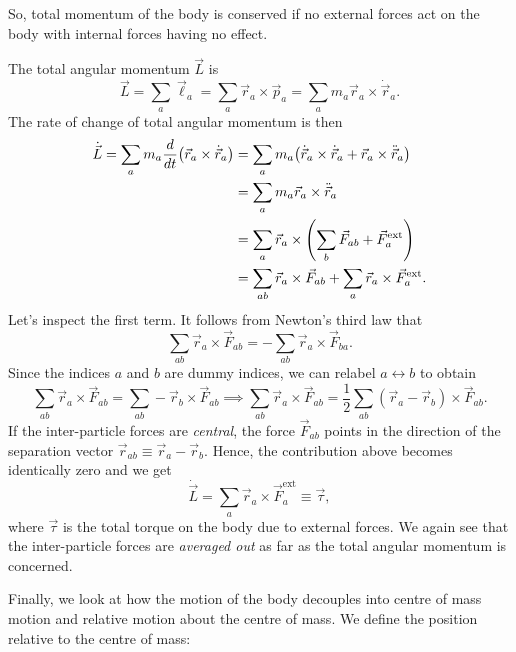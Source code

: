 \documentclass{article}
\begin{document}
So, total momentum of the body is conserved if no external forces act on the body with internal forces having no effect.
\par
The total angular momentum $\vec{L}$ is
\begin{equation}
    \vec{L} = \sum_a \vec{\ell}_a = \sum_a \vec{r}_a \times \vec{p}_a = \sum_a m_a \vec{r}_a \times \dot{\vec{r}}_a.
\end{equation}
The rate of change of total angular momentum is then
\begin{align}
    \begin{split}
        \dot{\vec{L}} = \sum_a m_a \dv{}{t} \qty(\vec{r}_a \times \dot{\vec{r}}_a) &= \sum_a m_a \qty(\dot{\vec{r}}_a \times \dot{\vec{r}}_a + \vec{r}_a \times \ddot{\vec{r}}_a) \\
        &= \sum_a m_a  \vec{r}_a \times \ddot{\vec{r}}_a \\
        &= \sum_a  \vec{r}_a \times \qty(\sum_b \vec{F}_{ab} + \vec{F}_a^{\text{ext}}) \\
        &= \sum_{ab} \vec{r}_a \times \vec{F}_{ab} + \sum_a \vec{r}_a \times \vec{F}_a^{\text{ext}}.
    \end{split}
\end{align}
Let's inspect the first term. It follows from Newton's third law that
\[
    \sum_{ab} \vec{r}_a \times \vec{F}_{ab} = - \sum_{ab} \vec{r}_a \times \vec{F}_{ba}.
\]
Since the indices $a$ and $b$ are dummy indices, we can relabel $a \leftrightarrow b$ to obtain
\begin{equation}
     \sum_{ab} \vec{r}_a \times \vec{F}_{ab} = \sum_{ab} -\vec{r}_b \times \vec{F}_{ab} \implies \sum_{ab} \vec{r}_a \times \vec{F}_{ab} = \frac{1}{2} \sum_{ab} (\vec{r}_a - \vec{r}_b) \times \vec{F}_{ab}.
\end{equation}
If the inter-particle forces are \textit{central}, the force $\vec{F}_{ab}$ points in the direction of the separation vector $\vec{r}_{ab} \equiv \vec{r}_a - \vec{r}_b$. Hence, the contribution above becomes identically zero and we get
\begin{equation}
    \dot{\vec{L}} = \sum_a \vec{r}_a \times \vec{F}_a^{\text{ext}} \equiv \vec{\tau},
\end{equation}
where $\vec{\tau}$ is the total torque on the body due to external forces. We again see that the inter-particle forces are \textit{averaged out} as far as the total angular momentum is concerned.
\par
Finally, we look at how the motion of the body decouples into centre of mass motion and relative motion about the centre of mass. We define the position relative to the centre of mass:
\end{document}
